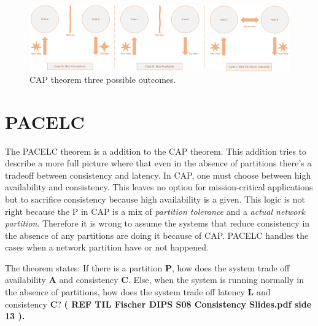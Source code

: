 \begin{figure}[h!]
	\centering
	\includegraphics[scale=0.44]{consistency/fig/cap_proof.png}
	\caption{CAP theorem three possible outcomes.}
	\label{fig:cap_proof}
\end{figure}


\section{PACELC}
The PACELC theorem is a addition to the CAP theorem. This addition tries to describe a more full picture where that even in the absence of partitions there's a tradeoff between consistency and latency. In CAP, one must choose between high availability and consistency. This leaves no option for mission-critical applications but to sacrifice consistency because high availability is a given. This logic is not right because the P in CAP is a mix of \textit{partition tolerance} and a \textit{actual network partition}. Therefore it is wrong to assume the systems that reduce consistency in the absence of any partitions are doing it because of CAP. PACELC handles the cases when a network partition have or not happened.

\noindent The theorem states: If there is a partition \textbf{P}, how does the system trade off availability \textbf{A} and consistency \textbf{C}. Else, when the system is running normally in
the absence of partitions, how does the system trade off latency \textbf{L}
and consistency \textbf{C}? \textbf{( REF TIL Fischer DIPS S08 Consistency Slides.pdf side 13 ).}


